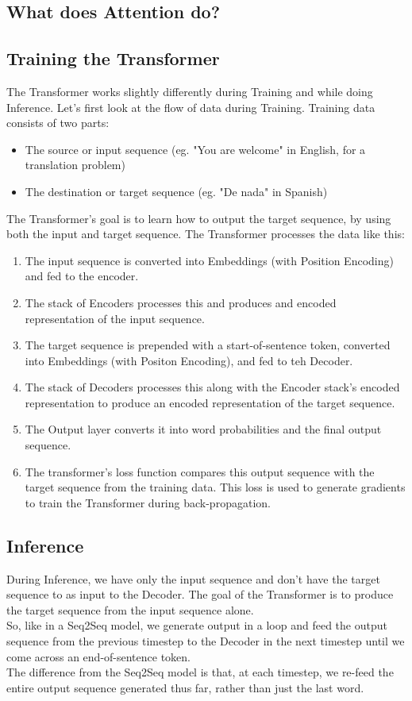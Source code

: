 \documentclass{article}
\begin{document}
\subsection{What does Attention do?}
\subsection{Training the Transformer}
The Transformer works slightly differently during Training and while doing Inference.
Let's first look at the flow of data during Training. Training data consists of two parts:
\begin{itemize}
    \item The source or input sequence (eg. "You are welcome" in English, for a translation problem)
    \item The destination or target sequence (eg. "De nada" in Spanish)
\end{itemize}


The Transformer's goal is to learn how to output the target sequence, by using both the input and target sequence. 
The Transformer processes the data like this:
\begin{enumerate}
    \item The input sequence is converted into Embeddings (with Position Encoding) and fed to the encoder.
    \item The stack of Encoders processes this and produces and encoded representation of the input sequence.
    \item The target sequence is prepended with a start-of-sentence token, converted into Embeddings (with Positon Encoding), and fed to teh Decoder.
    \item The stack of Decoders processes this along with the Encoder stack's encoded representation to produce an encoded representation of the target sequence.
    \item The Output layer converts it into word probabilities and the final output sequence.
    \item The transformer's loss function compares this output sequence with the target sequence from the training data. This loss is used to generate gradients to train the Transformer during back-propagation. 
\end{enumerate}
\subsection{Inference}
During Inference, we have only the input sequence and don't have the target sequence to as input to the Decoder. The goal of the Transformer is to produce the target sequence from the input sequence alone. \\
So, like in a Seq2Seq model, we generate output in a loop and feed the output sequence from the previous timestep to the Decoder in the next timestep until we come across an end-of-sentence token.  \\
The difference from the Seq2Seq model is that, at each timestep, we re-feed the entire output sequence generated thus far, rather than just the last word. \\
\end{document}
